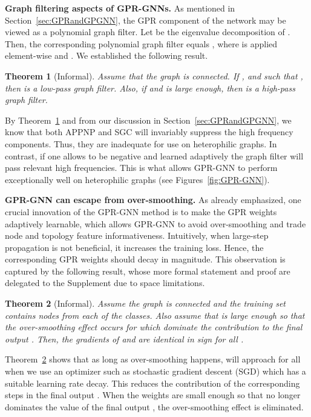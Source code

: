 \documentclass{article} \usepackage{iclr2021_conference,times}
\newtheorem{theorem}{Theorem}[section]
\begin{document}
\textbf{Graph filtering aspects of GPR-GNNs.} As mentioned in Section~\ref{sec:GPRandGPGNN}, the GPR component of the network may be viewed as a polynomial graph filter. Let  be the eigenvalue decomposition of . Then, the corresponding polynomial graph filter equals , where  is applied element-wise and . We established the following result.
\begin{theorem}[Informal]\label{thm:LPF}
    Assume that the graph  is connected. If ,  and  such that , then  is a low-pass graph filter. Also, if  and  is large enough, then  is a high-pass graph filter.
\end{theorem}
By Theorem~\ref{thm:LPF} and from our discussion in Section~\ref{sec:GPRandGPGNN}, we know that both APPNP and SGC will invariably suppress the high frequency components. Thus, they are inadequate for use on heterophilic graphs. In contrast, if one allows  to be negative and learned adaptively the graph filter will pass relevant high frequencies. This is what allows GPR-GNN to perform exceptionally well on heterophilic graphs (see Figures~\ref{fig:GPR-GNN}).

\textbf{GPR-GNN can escape from over-smoothing. }As already emphasized, one crucial innovation of the GPR-GNN method is to make the GPR weights adaptively learnable, which allows GPR-GNN to avoid over-smoothing and trade node and topology feature informativeness. Intuitively, when large-step propagation is not beneficial, it increases the training loss. Hence, the corresponding GPR weights should decay in magnitude. This observation is captured by the following result, whose more formal statement and proof are delegated to the Supplement due to space limitations.
\begin{theorem}[Informal]\label{thm:OS}
    Assume the graph  is connected and the training set contains nodes from each of the classes. Also assume that  is large enough so that the over-smoothing effect occurs for  which dominate the contribution to the final output . Then, the gradients of  and  are identical in sign for all .
\end{theorem}
Theorem~\ref{thm:OS} shows that as long as over-smoothing happens,  will approach  for all  when we use an optimizer such as stochastic gradient descent (SGD) which has a suitable learning rate decay. This reduces the contribution of the corresponding steps  in the final output . When the weights  are small enough so that  no longer dominates the value of the final output , the over-smoothing effect is eliminated.
\end{document}
